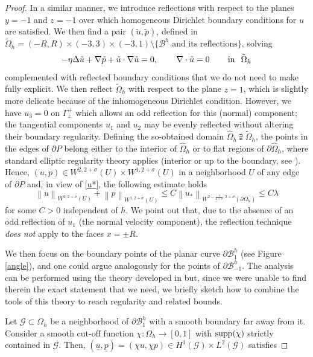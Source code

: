 \documentclass[11pt,a4paper]{amsart}
\theoremstyle{remark}
\theoremstyle{definition}
\numberwithin{equation}{section}
\numberwithin{proposition}{section}
\begin{document}
\begin{proof}
In a similar manner, we introduce reflections with respect to the planes $y=-1$ and $z=-1$ over which homogeneous Dirichlet boundary
conditions for $u$ are satisfied. We then find a pair $(\tilde{u},\tilde{p})$, defined in $\tilde{\Omega}_h=(-R,R)\times(-3,3)\times(-3,1)\setminus\{\mathcal{B}^h \mbox{ and its reflections}\}$, solving
\begin{equation*}
-\eta\Delta\tilde{u}+\nabla\tilde{p}+\tilde{u}\cdot\nabla\tilde{u}=0,\hspace{.3in}\nabla\cdot\tilde{u}=0\hspace{.3in}\mbox{in}\hspace{.1in}\tilde{\Omega}_h
\end{equation*}
complemented with reflected boundary conditions that we do not need to make fully explicit.
We then reflect $\tilde{\Omega}_h$ with respect to the plane
$z=1$, which is slightly more delicate because of the inhomogeneous Dirichlet condition. However, we have $u_3=0$ on $\Gamma^+_z$ which allows an odd reflection for this (normal) component; the tangential components $u_1$ and $u_2$ may be evenly reflected without altering their boundary regularity.
Defining the so-obtained domain $\hat{\Omega}_h\supsetneqq \tilde{\Omega}_h$, the points in the edges of $\partial P$ belong either to the interior of $\hat{\Omega}_h$ or to flat regions of $\partial \hat{\Omega}_h$, where standard elliptic regularity theory applies (interior or up to the boundary, see \cite{GA1}).
Hence,
$(u,p)\in W^{2,2+\sigma}(U)\times W^{1,2+\sigma}(U)$ in a neighborhood $U$ of any edge of $\partial P$ and, in view of \eqref{u*}, the following estimate holds
\begin{equation}\label{reg-est-vertices}
\left\|u\right\|_{W^{2,2+\sigma}(U)}+\left\|p\right\|_{W^{1,2+\sigma}(U)}\le C\left\|u_*\right\|_{W^{2-\frac{1}{2+\sigma},2+\sigma}(\partial\Omega_h)}\leq C \lambda
\end{equation}for some $C>0$ independent of $h$. We point out that, due to the absence of an odd reflection of $u_1$ (the normal velocity component), the reflection technique {\em does not} apply
to the faces $x=\pm R$.\par
We then focus on the boundary points of the planar curve $\partial\mathcal{B}_1^h$ (see Figure \ref{angle}), and one could argue analogously for the points of $\partial\mathcal{B}_{-1}^h$. The analysis can be performed using the theory developed in \cite{Mazya-Rossmann2010} but, since we were unable to find therein the exact statement that we need, we briefly sketch how to combine the tools of this theory to reach regularity and related
bounds.\par
Let $\mathcal{G}\subset \Omega_h$ be a neighborhood of $\partial\mathcal{B}_1^h$ with a smooth boundary far away from it.
Consider a smooth cut-off function  $\chi:\Omega_h \to [0,1]$ with ${\rm supp}(\chi)$ strictly contained in $\mathcal{G}$. Then,
$(\underline{u}, \underline{p})=(\chi u, \chi p) \in H^{1}(\mathcal{G})\times L^{2}(\mathcal{G})$ satisfies


\end{proof}
\end{document}
